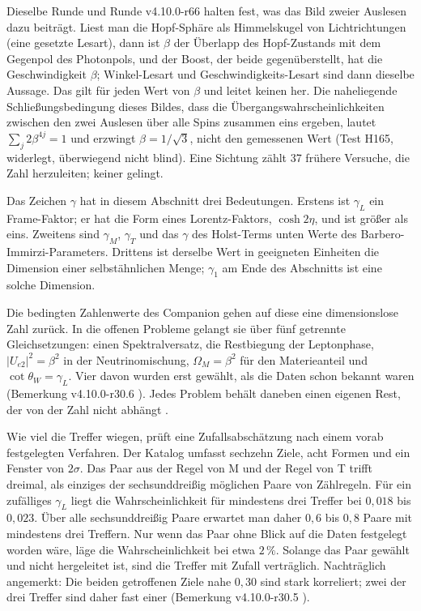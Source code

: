 Dieselbe Runde und Runde v4.10.0-r66 halten fest, was das Bild zweier Auslesen dazu beiträgt. Liest man die Hopf-Sphäre als Himmelskugel
von Lichtrichtungen (eine gesetzte Lesart), dann ist \(\beta\) der Überlapp des Hopf-Zustands mit dem Gegenpol des Photonpols, und der
Boost, der beide gegenüberstellt, hat die Geschwindigkeit \(\beta\); Winkel-Lesart und Geschwindigkeits-Lesart sind dann dieselbe
Aussage. Das gilt für jeden Wert von \(\beta\) und leitet keinen her. Die naheliegende Schließungsbedingung dieses Bildes, dass die
Übergangswahrscheinlichkeiten zwischen den zwei Auslesen über alle Spins zusammen eins ergeben, lautet \(\sum_j2\beta^{4j}=1\) und
erzwingt \(\beta=1/\sqrt3\), nicht den gemessenen Wert (Test H165, widerlegt, überwiegend nicht blind). Eine Sichtung zählt 37 frühere
Versuche, die Zahl herzuleiten; keiner gelingt.

Das Zeichen \(\gamma\) hat in diesem Abschnitt drei Bedeutungen. Erstens ist
\(\gamma_L\) ein Frame-Faktor; er hat die Form eines Lorentz-Faktors,
\(\cosh2\eta\), und ist größer als eins. Zweitens sind \(\gamma_M\),
\(\gamma_T\) und das \(\gamma\) des Holst-Terms unten Werte des
Barbero-Immirzi-Parameters. Drittens ist derselbe Wert in geeigneten Einheiten
die Dimension einer selbstähnlichen Menge; \(\gamma_1\) am Ende des Abschnitts
ist eine solche Dimension.

Die bedingten Zahlenwerte des Companion gehen auf diese eine
dimensionslose Zahl zurück. In die
offenen Probleme gelangt sie über fünf getrennte Gleichsetzungen: einen
Spektralversatz, die Restbiegung der Leptonphase, \(|U_{e2}|^2=\beta^2\) in
der Neutrinomischung, \(\Omega_M=\beta^2\) für den Materieanteil und
\(\cot\theta_W=\gamma_L\). Vier davon wurden erst gewählt, als die Daten schon
bekannt waren (Bemerkung v4.10.0-r30.6 \cite{companion}). Jedes Problem behält daneben einen eigenen Rest, der von der
Zahl nicht abhängt \cite{rootmap}.

Wie viel die Treffer wiegen, prüft eine Zufallsabschätzung nach einem vorab
festgelegten Verfahren. Der Katalog umfasst sechzehn Ziele, acht Formen und
ein Fenster von \(2\sigma\). Das Paar aus der Regel von M und der Regel von T
trifft dreimal, als einziges der sechsunddreißig möglichen Paare von
Zählregeln. Für ein zufälliges \(\gamma_L\) liegt die Wahrscheinlichkeit für
mindestens drei Treffer bei \(0{,}018\) bis \(0{,}023\). Über alle
sechsunddreißig Paare erwartet man daher \(0{,}6\) bis \(0{,}8\) Paare mit
mindestens drei Treffern. Nur wenn das Paar ohne Blick auf die Daten
festgelegt worden wäre, läge die Wahrscheinlichkeit bei etwa \(2\,\%\).
Solange das Paar gewählt und nicht hergeleitet ist, sind die
Treffer mit Zufall verträglich. Nachträglich angemerkt: Die beiden getroffenen
Ziele nahe \(0{,}30\) sind stark korreliert; zwei der drei Treffer sind daher
fast einer (Bemerkung v4.10.0-r30.5 \cite{chance,companion}).

